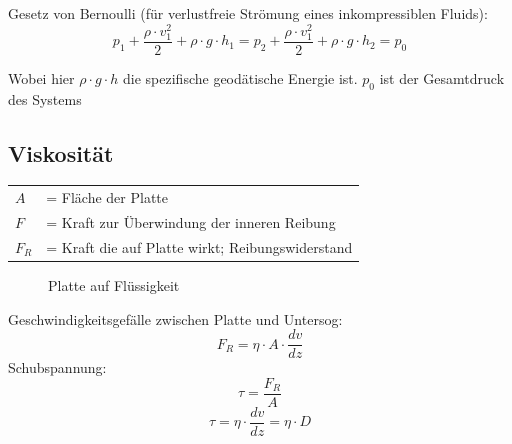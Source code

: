 \documentclass[a4paper,10pt]{article}
\begin{document}
 
Gesetz von Bernoulli (für verlustfreie Strömung eines inkompressiblen Fluids):
\begin{equation}
p_1 + \frac{\rho \cdot v_1^2}{2}+ \rho \cdot g \cdot h_1 =
p_2 + \frac{\rho \cdot v_1^2}{2}+ \rho \cdot g \cdot h_2 = p_0
\end{equation}
 \par Wobei hier $\rho \cdot g \cdot h$ die spezifische geodätische Energie ist. $p_0$ ist der Gesamtdruck des Systems

\subsection{Viskosität}
\begin{tabular}{ll}
$A$ &= Fläche der Platte\\
$F$ &= Kraft zur Überwindung der inneren Reibung \\
$F_R$ &= Kraft die auf Platte wirkt; Reibungswiderstand \\
 
\end{tabular}
\pp
\begin{figure}[h]
\centering
{}
\caption{Platte auf Flüssigkeit}
\end{figure}
\pp
Geschwindigkeitsgefälle zwischen Platte und Untersog:
\begin{equation}
F_R = \eta \cdot A \cdot \frac{dv}{dz}
\end{equation}
Schubspannung:
\begin{equation}
\tau = \frac{F_R}{A}
\end{equation}
\begin{equation}
\tau = \eta \cdot \frac{dv}{dz} = \eta \cdot D
\end{equation}




\end{document}
